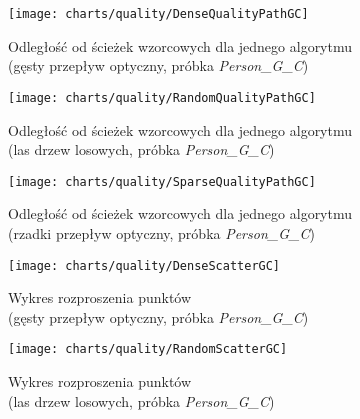       \begin{figure}[!ht]
        \centering
        \texttt{[image: charts/quality/DenseQualityPathGC]}
        \caption[Odległość od ścieżek wzorcowych dla jednego algorytmu  (gęsty przepływ optyczny, osoba G, gest C)]
                {Odległość od ścieżek wzorcowych dla jednego algorytmu\\(gęsty przepływ optyczny, próbka \textit{Person\_G\_C})}
        \label{fig:DenseQualityPathGC}
      \end{figure}

    \newpage
      \begin{figure}[!ht]
        \centering
        \texttt{[image: charts/quality/RandomQualityPathGC]}
        \caption[Odległość od ścieżek wzorcowych dla jednego algorytmu (las drzew losowych, osoba G, gest C)]
                {Odległość od ścieżek wzorcowych dla jednego algorytmu\\
                 (las drzew losowych, próbka \textit{Person\_G\_C})}
        \label{fig:RandomQualityPathGC}
      \end{figure}

      \begin{figure}[!ht]
        \centering
        \texttt{[image: charts/quality/SparseQualityPathGC]}
        \caption[Odległość od ścieżek wzorcowych dla jednego algorytmu (rzadki przepływ optyczny, osoba G, gest C)]
                {Odległość od ścieżek wzorcowych dla jednego algorytmu\\(rzadki przepływ optyczny, próbka \textit{Person\_G\_C})}
        \label{fig:SparseQualityPathGC}
      \end{figure}

    \newpage
      \begin{figure}[!ht]
        \centering
        \texttt{[image: charts/quality/DenseScatterGC]}
        \caption[Wykres rozproszenia punktów (gęsty przepływ optyczny)]
                {Wykres rozproszenia punktów\\(gęsty przepływ optyczny, próbka \textit{Person\_G\_C})}
        \label{fig:DenseScatterGC}
      \end{figure}

      \begin{figure}[!ht]
        \centering
        \texttt{[image: charts/quality/RandomScatterGC]}
        \caption[Wykres rozproszenia punktów (las drzew losowych)]
                {Wykres rozproszenia punktów\\(las drzew losowych, próbka \textit{Person\_G\_C})}
        \label{fig:RandomScatterGC}
      \end{figure}

